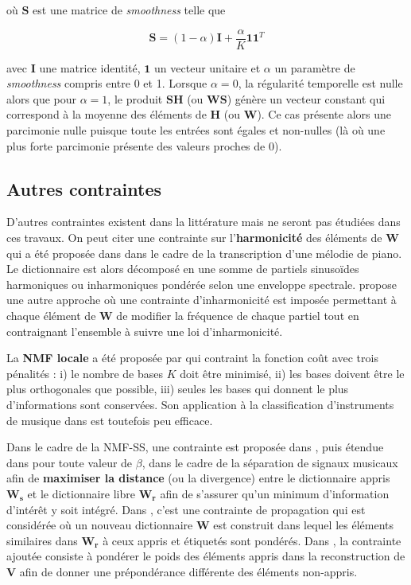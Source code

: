 où $\mathbf{S}$ est une matrice de \textit{smoothness} telle que

\begin{equation}
\mathbf{S} = (1-\alpha)\mathbf{I}+\frac{\alpha}{K}\mathbf{11}^T
\end{equation}

avec $\mathbf{I}$ une matrice identité, $\mathbf{1}$ un vecteur unitaire et $\alpha$ un paramètre de \textit{smoothness} compris entre 0 et 1. Lorsque $\alpha = 0$, la régularité temporelle est nulle alors que pour $\alpha = 1$, le produit $\mathbf{SH}$ (ou $\mathbf{WS}$) génère un vecteur constant qui correspond à la moyenne des éléments de $\mathbf{H}$ (ou $\mathbf{W}$). Ce cas présente alors une parcimonie nulle puisque toute les entrées sont égales et non-nulles (là où une plus forte parcimonie présente des valeurs proches de 0).

\subsection{Autres contraintes}

D'autres contraintes existent dans la littérature mais ne seront pas étudiées dans ces travaux.
On peut citer une contrainte sur l'\textbf{harmonicité} des éléments de $\mathbf{W}$ qui a été proposée dans \cite{vincent2008harmonic} dans le cadre de la transcription d'une mélodie de piano. Le dictionnaire est alors décomposé en une somme de partiels sinusoïdes harmoniques ou inharmoniques pondérée selon une enveloppe spectrale. \cite{rigaud2012piano} propose une autre approche où une contrainte d'inharmonicité est imposée permettant à chaque élément de $\mathbf{W}$ de modifier la fréquence de chaque partiel tout en contraignant l'ensemble à suivre une loi d'inharmonicité.

La \textbf{NMF locale} a été proposée par \cite{li2001learning} qui contraint la fonction coût avec trois pénalités : i) le nombre de bases $K$ doit être minimisé, ii) les bases doivent être le plus orthogonales que possible, iii) seules les bases qui donnent le plus d'informations sont conservées. Son application à la classification d'instruments de musique dans \cite{benetos2006musical} est toutefois peu efficace.

Dans le cadre de la NMF-SS, une contrainte est proposée dans \cite{yagi2012music}, puis étendue dans \cite{kitamura2014music} pour toute valeur de $\beta$, dans le cadre de la séparation de signaux musicaux afin de \textbf{maximiser la distance} (ou la divergence) entre le dictionnaire appris $\mathbf{W_s}$ et le dictionnaire libre $\mathbf{W_r}$ afin de s'assurer qu'un minimum d'information d'intérêt y soit intégré. Dans \cite{wang2016semi}, c'est une contrainte de propagation qui est considérée où un nouveau dictionnaire $\mathbf{W}$ est construit dans lequel les éléments similaires dans $\mathbf{W_r}$ à ceux appris et étiquetés sont pondérés. Dans \cite{lefevre2012semi}, la contrainte ajoutée consiste à pondérer le poids des éléments appris dans la reconstruction de $\mathbf{V}$ afin de donner une prépondérance différente des éléments non-appris.

